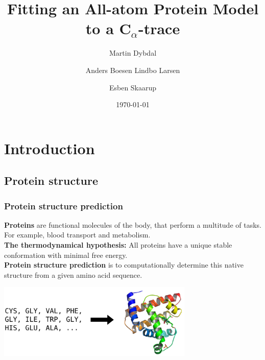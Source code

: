 \documentclass{beamer}
\title{Fitting an All-atom Protein Model to a C$_{\alpha}$-trace}
\author{\small Martin Dybdal \and Anders Boesen Lindbo Larsen \and Esben Skaarup}
\institute{\textrm{Department of Computer Science, University of Copenhagen}}
\date{\today}
\begin{document}
\frame{\titlepage}

\section{Introduction}
\subsection{Protein structure}

\begin{frame}[t, fragile]
  \frametitle{Protein structure prediction}
  \textbf{Proteins} are functional molecules of the body, that perform a
    multitude of tasks. For example, blood transport and metabolism.
\\\vspace*{2mm}
\textbf{The thermodynamical hypothesis:} All proteins have a unique
    stable conformation with minimal free energy.
\\\vspace*{2mm}
\textbf{Protein structure prediction} is to computationally
    determine this native structure from a given amino acid sequence.

    \begin{center}
      \includegraphics[width=0.7\textwidth]{psp.pdf}
    \end{center}
\end{frame}
\end{document}
